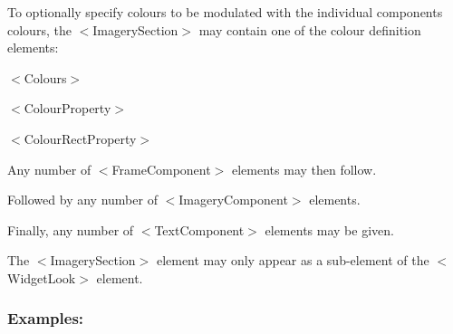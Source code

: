 \begin{DoxyItemize}
\item To optionally specify colours to be modulated with the individual component\textquotesingle{}s colours, the {\ttfamily $<$Imagery\+Section$>$} may contain one of the colour definition elements\+: 
\begin{DoxyItemize}
\item {\ttfamily $<$Colours$>$} 
\item {\ttfamily $<$Colour\+Property$>$} 
\item {\ttfamily $<$Colour\+Rect\+Property$>$} 
\end{DoxyItemize}


\item Any number of {\ttfamily $<$Frame\+Component$>$} elements may then follow. 
\item Followed by any number of {\ttfamily $<$Imagery\+Component$>$} elements. 
\item Finally, any number of {\ttfamily $<$Text\+Component$>$} elements may be given. 
\item The {\ttfamily $<$Imagery\+Section$>$} element may only appear as a sub-\/element of the {\ttfamily $<$Widget\+Look$>$} element. 
\end{DoxyItemize}\hypertarget{fal_element_ref_fal_elem_ref_sec_22_4}{}\subsubsection{Examples\+:}\label{fal_element_ref_fal_elem_ref_sec_22_4}

